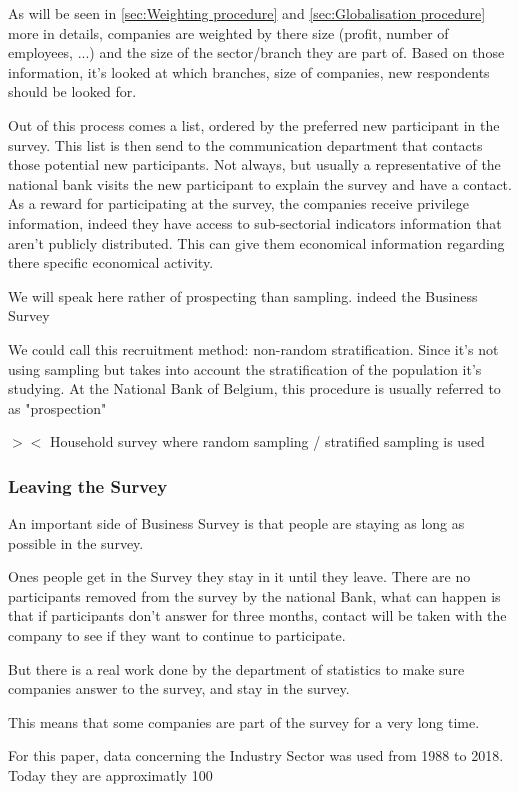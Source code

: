 \documentclass[12pt,a4paper,oneside]{book}
\begin{document}
As will be seen in \autoref{sec:Weighting procedure} and \autoref{sec:Globalisation procedure} more in details, companies are weighted by there size (profit, number of employees, ...) and the size of the sector/branch they are part of. 
Based on those information, it's looked at which branches, size of companies, new respondents should be looked for.
 
Out of this process comes a list, ordered by the preferred new participant in the survey. This list is then send to the communication department that contacts those potential new participants. 
Not always, but usually a representative of the national bank visits the new participant to explain the survey and have a contact.
As a reward for participating at the survey, the companies receive privilege information, indeed they have access to sub-sectorial indicators information that aren't publicly distributed. This can give them economical information regarding there specific economical activity.

We will speak here rather of prospecting than sampling. indeed the Business Survey 

We could call this recruitment method: non-random stratification. Since it's not using sampling but takes into account the stratification of the population it's studying. At the National Bank of Belgium, this procedure is usually referred to as "prospection"

$><$ Household survey where random sampling / stratified sampling is used

\subsubsection*{Leaving the Survey}

An important side of Business Survey is that people are staying as long as possible in the survey.

Ones  people get in the Survey they stay in it until they leave. There are no participants removed from the survey by the national Bank, what can happen is that if participants don't answer for three months, contact will be taken with the company to see if they want to continue to participate.

But there is a real work done by the department of statistics to make sure companies answer to the survey, and stay in the survey.

This means that some companies are part of the survey for a very long time.

For this paper, data concerning the Industry Sector was used from 1988 to 2018. Today they are approximatly 100
\end{document}
